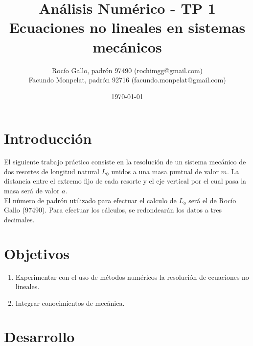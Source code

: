 \documentclass[10pt,a4paper]{article}
\title{%
  Análisis Numérico - TP 1 \\
  \large Ecuaciones no lineales en sistemas mecánicos}
\author{Rocío Gallo, padrón 97490 (rochimgg@gmail.com)\\ Facundo Monpelat, padrón 92716 (facundo.monpelat@gmail.com)}
\date{\today} %
\begin{document}


\maketitle %

\section{Introducción}

El siguiente trabajo práctico consiste en la resolución de un sistema mecánico de dos resortes de longitud natural $L_{0}$ unidos a una masa puntual de valor $m$. La distancia entre el extremo fijo de cada resorte y el eje vertical por el cual pasa la masa será de valor $a$.\\

El número de padrón utilizado para efectuar el calculo de $L_{o}$ será el de Rocío Gallo (97490). Para efectuar los cálculos, se redondearán los datos a tres decimales.\\


\section{Objetivos}
\begin{enumerate}
\item Experimentar con el uso de métodos numéricos la resolución de ecuaciones no lineales.
\item Integrar conocimientos de mecánica.
\end{enumerate}

\section{Desarrollo}
\end{document}
